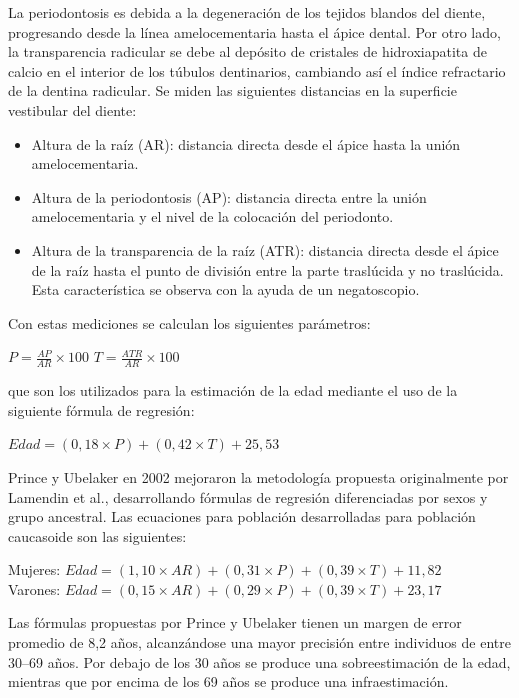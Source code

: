 \documentclass[a4paper,11pt]{article}
\begin{document}
La periodontosis es debida a la degeneración de los tejidos blandos del diente, progresando desde la línea amelocementaria hasta el ápice dental. Por otro lado, la transparencia radicular se debe al depósito de cristales de hidroxiapatita de calcio en el interior de los túbulos dentinarios, cambiando así el índice refractario de la dentina radicular.
Se miden las siguientes distancias en la superficie vestibular del diente:
\begin{itemize}
\item Altura de la raíz (AR): distancia directa desde el ápice hasta la unión amelocementaria.
\item Altura de la periodontosis (AP): distancia directa entre la unión amelocementaria y el nivel de la colocación del periodonto.
\item Altura de la transparencia de la raíz (ATR): distancia directa desde el ápice de la raíz hasta el punto de división entre la parte traslúcida y no traslúcida. Esta característica se observa con la ayuda de un negatoscopio.
\end{itemize}
Con estas mediciones se calculan los siguientes parámetros:
\begin{center}
$P=\frac{AP}{AR}\times 100$
$T=\frac{ATR}{AR}\times 100$
\end{center}
que son los utilizados para la estimación de la edad mediante el uso de la siguiente fórmula de regresión:
\begin{center}
$Edad=(0,18\times P)+(0,42\times T)+25,53$
\end{center}
Prince y Ubelaker en 2002 mejoraron la metodología propuesta originalmente por Lamendin et al., desarrollando fórmulas de regresión diferenciadas por sexos y grupo ancestral. Las ecuaciones para población desarrolladas para población caucasoide son las siguientes:
\begin{center}
Mujeres: $Edad=(1,10\times AR)+(0,31\times P)+(0,39\times T)+11,82$\\
Varones: $Edad=(0,15\times AR)+(0,29\times P)+(0,39\times T)+23,17$
\end{center}
Las fórmulas propuestas por Prince y Ubelaker tienen un margen de error promedio de 8,2 años, alcanzándose una mayor precisión entre individuos de entre 30–69 años. Por debajo de los 30 años se produce una sobreestimación de la edad, mientras que por encima de los 69 años se produce una infraestimación.
\newpage

\end{document}

